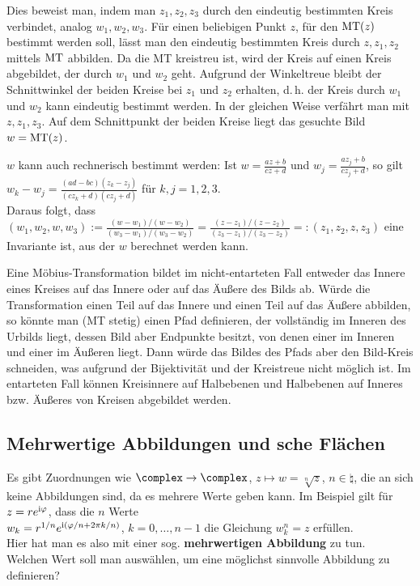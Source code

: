 Dies beweist man, indem man $z_1, z_2, z_3$ durch den eindeutig bestimmten
Kreis verbindet, analog $w_1, w_2, w_3$.
Für einen beliebigen Punkt $z$, für den $\operatorname{MT}(z)$
bestimmt werden soll, lässt man den eindeutig bestimmten Kreis durch
$z, z_1, z_2$ mittels $\operatorname{MT}$ abbilden.
Da die MT kreistreu ist, wird der Kreis auf einen Kreis
abgebildet, der durch $w_1$ und $w_2$ geht.
Aufgrund der Winkeltreue bleibt der Schnittwinkel der beiden Kreise bei
$z_1$ und $z_2$ erhalten, d.\,h. der Kreis durch $w_1$ und $w_2$ kann eindeutig
bestimmt werden.
In der gleichen Weise verfährt man mit $z, z_1, z_3$.
Auf dem Schnittpunkt der beiden Kreise liegt das gesuchte Bild
$w = \operatorname{MT}(z)$.

$w$ kann auch rechnerisch bestimmt werden:
Ist $w = \frac{az + b}{cz + d}$ und $w_j = \frac{a z_j + b}{c z_j + d}$, so
gilt\\
$w_k - w_j = \frac{(ad - bc)(z_k - z_j)}{(c z_k + d)(c z_j + d)}$ für
$k, j = 1, 2, 3$.\\
Daraus folgt, dass
$(w_1, w_2, w, w_3) := \frac{(w - w_1)/(w - w_2)}{(w_3 - w_1)/(w_3 - w_2)} =
\frac{(z - z_1)/(z - z_2)}{(z_3 - z_1)/(z_3 - z_2)} =: (z_1, z_2, z, z_3)$
eine Invariante ist, aus der $w$ berechnet werden kann.

\linie

Eine Möbius-Transformation bildet im nicht-entarteten Fall entweder das Innere
eines Kreises auf das Innere oder auf das Äußere des Bilds ab.
Würde die Transformation einen Teil auf das Innere und einen Teil auf das
Äußere abbilden, so könnte man (MT stetig) einen Pfad definieren, der
vollständig im Inneren des Urbilds liegt, dessen Bild aber Endpunkte besitzt,
von denen einer im Inneren und einer im Äußeren liegt.
Dann würde das Bildes des Pfads aber den Bild-Kreis schneiden, was aufgrund
der Bijektivität und der Kreistreue nicht möglich ist.
Im entarteten Fall können Kreisinnere auf Halbebenen und Halbebenen auf Inneres
bzw. Äußeres von Kreisen abgebildet werden.

\subsection{%
    Mehrwertige Abbildungen und sche Flächen%
}

Es gibt Zuordnungen wie $\complex \rightarrow \complex$,
$z \mapsto w = \sqrt[n]{z}$, $n \in \natural$,
die an sich keine Abbildungen sind, da es mehrere Werte geben kann.
Im Beispiel gilt für $z = r e^{\mathrm{i}\varphi}$, dass die $n$ Werte\\
$w_k = r^{1/n} e^{\mathrm{i}(\varphi/n + 2\pi k/n)}$, $k = 0, \dotsc, n - 1$
die Gleichung $w_k^n = z$ erfüllen.\\
Hier hat man es also mit einer sog. \textbf{mehrwertigen Abbildung} zu tun.\\
Welchen Wert soll man auswählen, um eine möglichst sinnvolle Abbildung
zu definieren?


